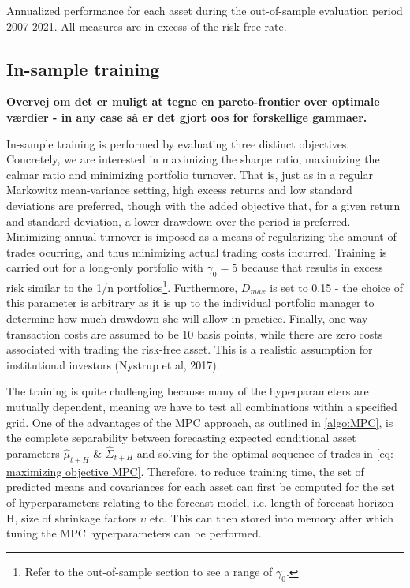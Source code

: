 \begin{table}[H]
\small
\centering
\caption[Annualized
performance for each asset during the out-of-sample period]{Annualized
performance for each asset during the out-of-sample evaluation period 2007-2021. All measures are in excess of the risk-free rate.}

\label{tab:MPC_asset_performance}
\end{table}

\subsection{In-sample training}

\textbf{Overvej om det er muligt at tegne en pareto-frontier over optimale værdier - in any case så er det gjort oos for forskellige gammaer.}

In-sample training is performed by evaluating three distinct objectives. Concretely, we are interested in maximizing the sharpe ratio, maximizing the calmar ratio and minimizing portfolio turnover. That is, just as in a regular Markowitz mean-variance setting, high excess returns and low standard deviations are preferred, though with the added objective that, for a given return and standard deviation, a lower drawdown over the period is preferred. Minimizing annual turnover is imposed as a means of regularizing the amount of trades ocurring, and thus minimizing actual trading costs incurred. Training is carried out for a long-only portfolio with $\gamma_0=5$ because that results in excess risk similar to the 1/n portfolios\footnote
{Refer to the out-of-sample section to see a range of $\gamma_0$.
}. Furthermore, $D_{max}$ is set to 0.15 - the choice of this parameter is arbitrary as it is up to the individual portfolio manager to determine how much drawdown she will allow in practice. Finally, one-way transaction costs are assumed to be 10 basis points, while there are zero costs associated with trading the risk-free asset. This is a realistic assumption for institutional investors (Nystrup et al, 2017).

The training is quite challenging because many of the hyperparameters are mutually dependent, meaning we have to test all combinations within a specified grid. One of the advantages of the MPC approach, as outlined in \cref{algo:MPC}, is the complete separability between forecasting expected conditional asset parameters $\hat\mu_{t+H}$ \& $\hat\Sigma_{t+H}$ and solving for the optimal sequence of trades in \cref{eq: maximizing objective MPC}. Therefore, to reduce training time, the set of predicted means and covariances for each asset can first be computed for the set of hyperparameters relating to the forecast model, i.e. length of forecast horizon H, size of shrinkage factors $\upsilon$ etc. This can then stored into memory after which tuning the MPC hyperparameters can be performed.

